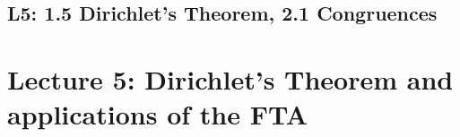 \documentclass[10pt]{article}
\theoremstyle{definition}
\newtheorem{remark}{Remark}[section]
\theoremstyle{plain}
\newtheorem{corollary}{Corollary}[section]
\numberwithin{equation}{section}
\begin{document}
















































\newpage
\subsection{L5: 1.5 Dirichlet's Theorem, 2.1 Congruences}

\section*{Lecture 5: Dirichlet's Theorem and applications of the FTA}
\end{document}
